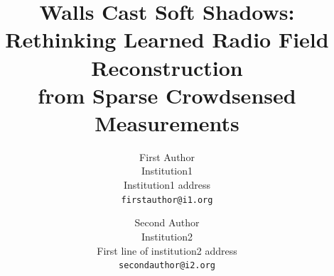\documentclass[10pt,twocolumn,letterpaper]{article}
\title{Walls Cast Soft Shadows: Rethinking Learned Radio Field Reconstruction\\from Sparse Crowdsensed Measurements}
\author{First Author\\
Institution1\\
Institution1 address\\
{\tt\small firstauthor@i1.org}
\and
Second Author\\
Institution2\\
First line of institution2 address\\
{\tt\small secondauthor@i2.org}
}
\begin{document}
\maketitle








{
    \small
    
    
}

% 
\end{document}
